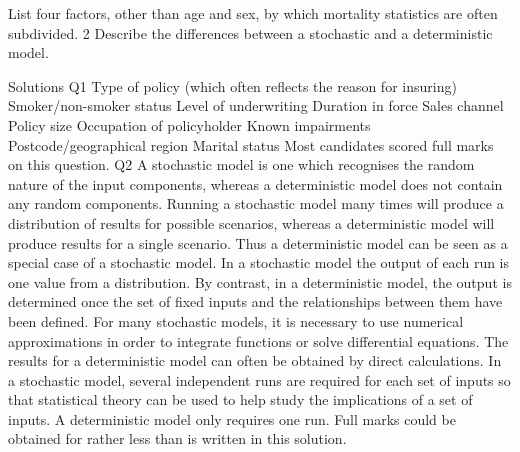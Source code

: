 \documentclass[a4paper,12pt]{article}
\begin{document}
List four factors, other than age and sex, by which mortality statistics are often
subdivided. 
2 Describe the differences between a stochastic and a deterministic model. 



Solutions
Q1
Type of policy (which often reflects the reason for insuring)
Smoker/non-smoker status
Level of underwriting
Duration in force
Sales channel
Policy size
Occupation of policyholder
Known impairments
Postcode/geographical region
Marital status
Most candidates scored full marks on this question.
\newpage
Q2
A stochastic model is one which recognises the random nature of the input
components, whereas a deterministic model does not contain any random
components.
Running a stochastic model many times will produce a distribution of results for
possible scenarios, whereas a deterministic model will produce results for a single
scenario.
Thus a deterministic model can be seen as a special case of a stochastic model.
In a stochastic model the output of each run is one value from a distribution.
By contrast, in a deterministic model, the output is determined once the set of fixed
inputs and the relationships between them have been defined.
For many stochastic models, it is necessary to use numerical approximations in order
to integrate functions or solve differential equations.
The results for a deterministic model can often be obtained by direct calculations.
In a stochastic model, several independent runs are required for each set of inputs so
that statistical theory can be used to help study the implications of a set of inputs.
A deterministic model only requires one run.
Full marks could be obtained for rather less than is written in this solution.
\end{document}
